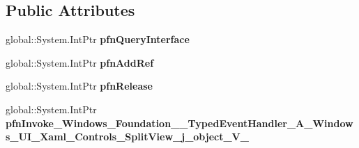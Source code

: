 \subsection*{Public Attributes}
\begin{DoxyCompactItemize}
\item 
\mbox{\label{struct_windows_1_1_foundation_1_1_typed_event_handler___a___windows___u_i___xaml___controls___spbe6956be4b8dd5e753952ceff0bf2f92_a0fece1448cb58865aa23bb40a1d87e5b}} 
global\+::\+System.\+Int\+Ptr {\bfseries pfn\+Query\+Interface}
\item 
\mbox{\label{struct_windows_1_1_foundation_1_1_typed_event_handler___a___windows___u_i___xaml___controls___spbe6956be4b8dd5e753952ceff0bf2f92_aaa37cfe6e708aa2ca896a08290b6487a}} 
global\+::\+System.\+Int\+Ptr {\bfseries pfn\+Add\+Ref}
\item 
\mbox{\label{struct_windows_1_1_foundation_1_1_typed_event_handler___a___windows___u_i___xaml___controls___spbe6956be4b8dd5e753952ceff0bf2f92_aa92e63bb8d1430ab90346cc875d6b12c}} 
global\+::\+System.\+Int\+Ptr {\bfseries pfn\+Release}
\item 
\mbox{\label{struct_windows_1_1_foundation_1_1_typed_event_handler___a___windows___u_i___xaml___controls___spbe6956be4b8dd5e753952ceff0bf2f92_ac9966f625aa316d060eaea8e5061e43c}} 
global\+::\+System.\+Int\+Ptr {\bfseries pfn\+Invoke\+\_\+\+Windows\+\_\+\+Foundation\+\_\+\+\_\+\+Typed\+Event\+Handler\+\_\+\+A\+\_\+\+Windows\+\_\+\+U\+I\+\_\+\+Xaml\+\_\+\+Controls\+\_\+\+Split\+View\+\_\+j\+\_\+object\+\_\+\+V\+\_\+}
\end{DoxyCompactItemize}
